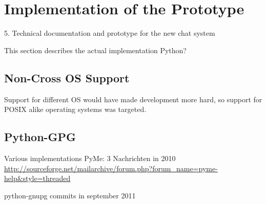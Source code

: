 \section{Implementation of the Prototype}

5. Technical documentation and prototype for the new chat system



This section describes the actual implementation
Python?
\subsection{Non-Cross OS Support}
Support for different OS would have made development more
hard, so support for POSIX alike operating systems was targeted.

\subsection{Python-GPG}
Various implementations \cite{python-gpg}
PyMe: 3 Nachrichten in 2010
\url{http://sourceforge.net/mailarchive/forum.php?forum_name=pyme-help&style=threaded}

python-gnupg commits in september 2011 \cite{python-gnupg}
